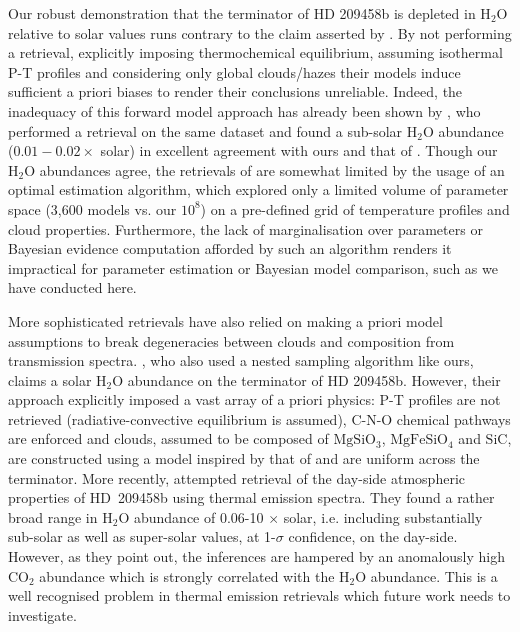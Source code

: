 \documentclass[fleqn,usenatbib]{mnras}
\begin{document}
Our robust demonstration that the terminator of HD 209458b is depleted in H$_2$O relative to solar values runs contrary to the claim asserted by \citet{Sing2016}. By not performing a retrieval, explicitly imposing thermochemical equilibrium, assuming isothermal P-T profiles and considering only global clouds/hazes their models induce sufficient a priori biases to render their conclusions unreliable. Indeed, the inadequacy of this forward model approach has already been shown by \citet{Barstow2016}, who performed a retrieval on the same dataset and found a sub-solar H$_2$O abundance ($0.01-0.02\times$ solar) in excellent agreement with ours and that of \citet{Madhusudhan2014c}. Though our H$_2$O abundances agree, the retrievals of \citet{Barstow2016} are somewhat limited by the usage of an optimal estimation algorithm, which explored only a limited volume of parameter space (3,600 models vs. our $10^{8}$) on a pre-defined grid of temperature profiles and cloud properties. Furthermore, the lack of marginalisation over parameters or Bayesian evidence computation afforded by such an algorithm renders it impractical for parameter estimation or Bayesian model comparison, such as we have conducted here. 

More sophisticated retrievals have also relied on making a priori model assumptions to break degeneracies between clouds and composition from transmission spectra. \citet{Benneke2015}, who also used a nested sampling algorithm like ours, claims a solar H$_2$O abundance on the terminator of HD 209458b. However, their approach explicitly imposed a vast array of a priori physics: P-T profiles are not retrieved (radiative-convective equilibrium is assumed), C-N-O chemical pathways are enforced and clouds, assumed to be composed of $\mathrm{Mg Si O_3}$, $\mathrm{Mg Fe Si O_4}$ and $\mathrm{Si C}$, are constructed using a model inspired by that of \citet{Ackerman2001} and are uniform across the terminator. More recently, \cite{Line2016b} attempted retrieval of the day-side atmospheric properties of HD~209458b using thermal emission spectra. They found a rather broad range in H$_2$O abundance of 0.06-10 $\times$ solar, i.e. including substantially sub-solar as well as super-solar values, at 1-$\sigma$ confidence, on the day-side. However, as they point out, the inferences are hampered by an anomalously high CO$_2$ abundance which is strongly correlated with the H$_2$O abundance. This is a well recognised problem \citep{Heng2016} in thermal emission retrievals which future work needs to investigate. 
\end{document}
